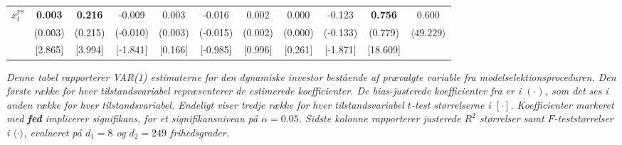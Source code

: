 \documentclass[
  a4paper,
  oneside]{memoir}
\begin{document}
\begin{table}[H]
{\begin{threeparttable}
\begin{tabular}[t]{ccccccccccc}
$x_t^{\text{ys}}$ & \textbf{ 0.003} & \textbf{ 0.216} & -0.009 & 0.003 & -0.016 & 0.002 & 0.000 & -0.123 & \textbf{ 0.756} & 0.600\\
 
\rowcolor{gray!6}   & (0.003) & (0.215) & (-0.010) & (0.003) & (-0.015) & (0.002) & (0.000) & (-0.133) & (0.779) & $\langle49.229\rangle$\\
 
 & [2.865] & [3.994] & [-1.841] & [0.166] & [-0.985] & [0.996] & [0.261] & [-1.871] & [18.609] & \\
\bottomrule
\end{tabular}
\begin{tablenotes}
\item \textit{Denne tabel rapporterer VAR(1) estimaterne for den dynamiske investor bestående af prævalgte variable fra modelselektionsproceduren. Den første række for hver tilstandsvariabel repræsenterer de estimerede koefficienter. De bias-justerede koefficienter fra \citep{Pope1990} er i $(\cdot)$, som det ses i anden række for hver tilstandsvariabel. Endeligt viser tredje række for hver tilstandsvariabel $t$-test størrelserne i $[\cdot]$. Koefficienter markeret med \textbf{fed} implicerer signifikans, for et signifikansniveau på $\alpha=0.05$. Sidste kolonne rapporterer justerede $R^2$ størrelser samt $F$-teststørrelser i $\langle\cdot\rangle$, evalueret på $d_1=8$ og $d_2=249$ frihedsgrader.}
\end{tablenotes}
\end{threeparttable}}
\end{table}
\end{document}
